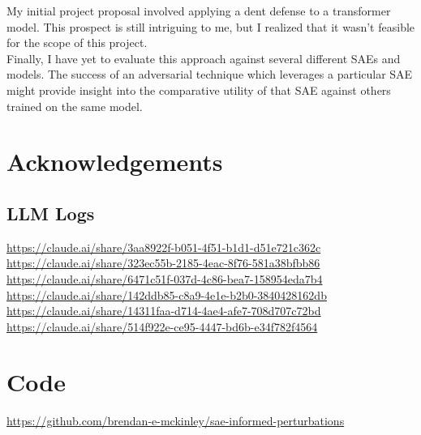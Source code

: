 \documentclass{article}
\begin{document}
My initial project proposal involved applying a dent defense to a transformer model. This prospect is still intriguing to me, but I realized that it wasn't feasible for the scope of this project. \\

Finally, I have yet to evaluate this approach against several different SAEs and models. The success of an adversarial technique which leverages a particular SAE might provide insight into the comparative utility of that SAE against others trained on the same model. 

\section*{Acknowledgements} 

\subsection*{LLM Logs}

\url{https://claude.ai/share/3aa8922f-b051-4f51-b1d1-d51e721c362c}\\

\url{https://claude.ai/share/323ec55b-2185-4eac-8f76-581a38bfbb86}\\

\url{https://claude.ai/share/6471c51f-037d-4c86-bea7-158954eda7b4}\\

\url{https://claude.ai/share/142ddb85-c8a9-4e1e-b2b0-3840428162db}\\

\url{https://claude.ai/share/14311faa-d714-4ae4-afe7-708d707c72bd}\\

\url{https://claude.ai/share/514f922e-ce95-4447-bd6b-e34f782f4564}

\section*{Code}

\url{https://github.com/brendan-e-mckinley/sae-informed-perturbations}

 

\end{document}

